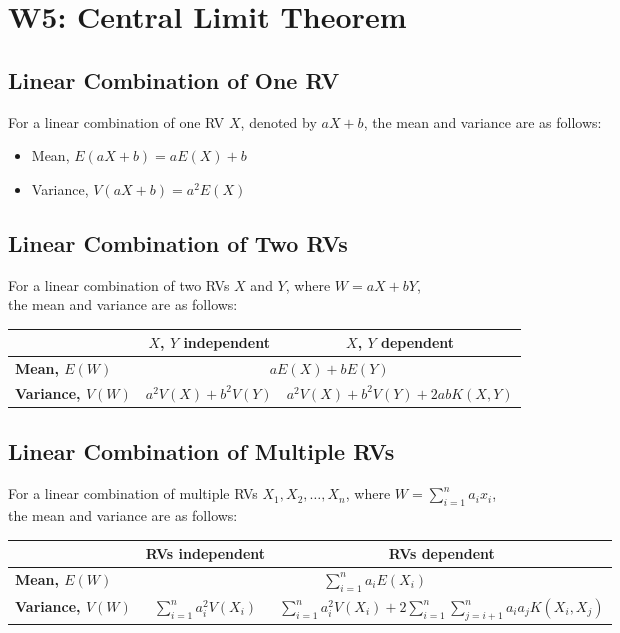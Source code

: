 \documentclass[a4paper]{article}
\begin{document}
\section{W5: Central Limit Theorem}
\subsection{Linear Combination of One RV}
For a linear combination of one RV $X$, denoted by $aX + b$, the mean and variance are as follows:
\begin{itemize}
    \item Mean, $E(aX+b) = aE(X)+b$
    \item Variance, $V(aX+b) = a^{2}E(X)$
\end{itemize}
\subsection{Linear Combination of Two RVs}
For a linear combination of two RVs $X$ and $Y$, where $W = aX + bY$,\\the mean and variance are as follows:
\begin{table}[H]
\centering
\begin{tabular}{|l|c|c|}
\hline
                          & \textbf{$X$, $Y$ independent} & \textbf{$X$, $Y$ dependent}         \\ \hline
\textbf{Mean, $E(W)$}     & \multicolumn{2}{c|}{$aE(X) + bE(Y)$}                                \\ \hline
\textbf{Variance, $V(W)$} & $a^{2}V(X) + b^{2}V(Y)$       & $a^{2}V(X) + b^{2}V(Y)+2abK(X, Y)$ \\ \hline
\end{tabular}
\end{table}
\subsection{Linear Combination of Multiple RVs}
For a linear combination of multiple RVs $X_{1}, X_{2}, \ldots, X_{n}$, where $\displaystyle W = \sum_{i=1}^{n}a_{i}x_{i}$,\\the mean and variance are as follows:
\begin{table}[H]
\centering
{\tabulinesep=1.2mm
\begin{tabu}{|l|c|c|}
\hline
                          & \textbf{RVs independent}                        & \textbf{RVs dependent}                                                                                      \\ \hline
\textbf{Mean, $E(W)$}     &                                                                                               \\ \hline
\textbf{Variance, $V(W)$} & $\displaystyle \sum_{i=1}^{n}a_{i}^{2}V(X_{i})$ & $\displaystyle \sum_{i=1}^{n}a_{i}^{2}V(X_{i}) + 2\sum_{i=1}^{n}\sum_{j = i+1}^{n}a_{i}a_{j}K(X_{i}, X_{j})$ \\ \hline
\end{tabu}
}
\end{table}
\end{document}
